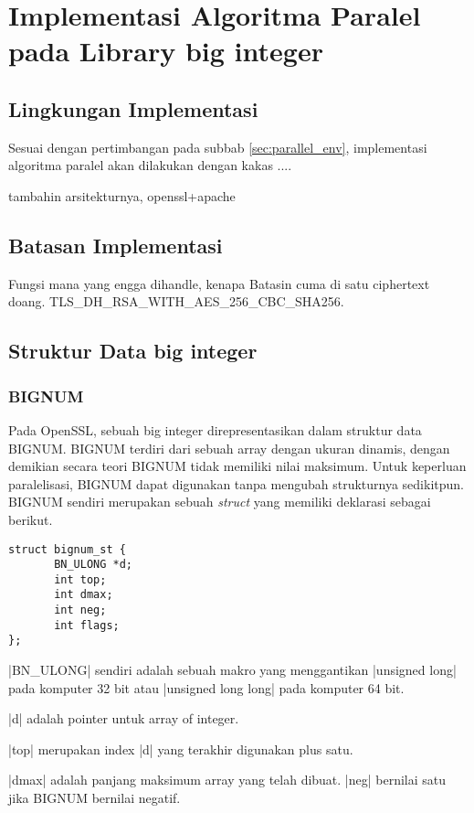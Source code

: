 
\section{Implementasi Algoritma Paralel pada Library big integer}
\subsection{Lingkungan Implementasi}
Sesuai dengan pertimbangan pada subbab \ref{sec:parallel_env}, implementasi algoritma paralel akan dilakukan dengan kakas ....

tambahin arsitekturnya, openssl+apache

\subsection{Batasan Implementasi}
Fungsi mana yang engga dihandle, kenapa
Batasin cuma di satu ciphertext doang. TLS\_DH\_RSA\_WITH\_AES\_256\_CBC\_SHA256.

\subsection{Struktur Data big integer}
\subsubsection{BIGNUM}
Pada OpenSSL, sebuah big integer direpresentasikan dalam struktur data BIGNUM. BIGNUM terdiri dari sebuah array dengan ukuran dinamis, dengan demikian secara teori BIGNUM tidak memiliki nilai maksimum. Untuk keperluan paralelisasi, BIGNUM dapat digunakan tanpa mengubah strukturnya sedikitpun. BIGNUM sendiri merupakan sebuah \textit{struct} yang memiliki deklarasi sebagai berikut.

\begin{lstlisting}[style = code]
struct bignum_st {
       BN_ULONG *d;
       int top;
       int dmax;
       int neg;
       int flags;
};
\end{lstlisting}

|BN_ULONG| sendiri adalah sebuah makro yang menggantikan |unsigned long| pada komputer 32 bit atau |unsigned long long| pada komputer 64 bit.

|d| adalah pointer untuk array of integer.

|top| merupakan index |d| yang terakhir digunakan plus satu.

|dmax| adalah panjang maksimum array yang telah dibuat. |neg| bernilai satu jika BIGNUM bernilai negatif.


